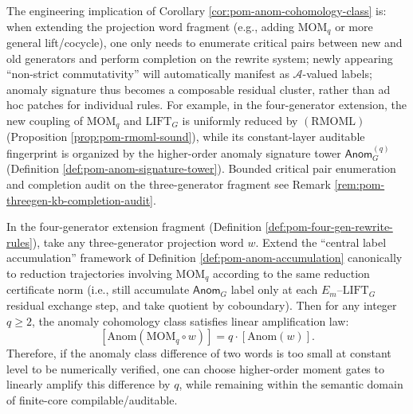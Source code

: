 \begin{remark}\label{rem:pom-anom-completion}
The engineering implication of Corollary \ref{cor:pom-anom-cohomology-class} is: when extending the projection word fragment (e.g., adding \(\mathrm{MOM}_q\) or more general lift/cocycle), one only needs to enumerate critical pairs between new and old generators and perform completion on the rewrite system; newly appearing ``non-strict commutativity'' will automatically manifest as \(\mathcal{A}\)-valued labels; anomaly signature thus becomes a composable residual cluster, rather than ad hoc patches for individual rules.
For example, in the four-generator extension, the new coupling of \(\mathrm{MOM}_q\) and \(\mathrm{LIFT}_G\) is uniformly reduced by \((\mathrm{RMOML})\) (Proposition \ref{prop:pom-rmoml-sound}), while its constant-layer auditable fingerprint is organized by the higher-order anomaly signature tower \(\mathsf{Anom}^{(q)}_G\) (Definition \ref{def:pom-anom-signature-tower}).
Bounded critical pair enumeration and completion audit on the three-generator fragment see Remark \ref{rem:pom-threegen-kb-completion-audit}.
\end{remark}

\begin{proposition}\label{prop:pom-anom-moment-amplification}
In the four-generator extension fragment (Definition \ref{def:pom-four-gen-rewrite-rules}), take any three-generator projection word \(w\).
Extend the ``central label accumulation'' framework of Definition \ref{def:pom-anom-accumulation} canonically to reduction trajectories involving \(\mathrm{MOM}_q\) according to the same reduction certificate norm (i.e., still accumulate \(\mathsf{Anom}_G\) label only at each \(E_m\)--\(\mathrm{LIFT}_G\) residual exchange step, and take quotient by coboundary).
Then for any integer \(q\ge 2\), the anomaly cohomology class satisfies linear amplification law:
\[
\boxed{\;
[\mathrm{Anom}(\mathrm{MOM}_q\circ w)]
=
q\cdot [\mathrm{Anom}(w)].\;}
\]
Therefore, if the anomaly class difference of two words is too small at constant level to be numerically verified, one can choose higher-order moment gates to linearly amplify this difference by \(q\), while remaining within the semantic domain of finite-core compilable/auditable.
\end{proposition}

